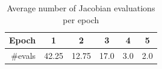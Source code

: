 \begin{table}
\renewcommand{\arraystretch}{1.3}
\centering
\small
{}
\caption{Results of training a recurrent neural network}
\label{rectab}
\end{table}


\begin{table}
\centering
\begin{tabular}{r| c c c c c }
Epoch	 	& 1	& 2 & 3 & 4 & 5 \\ \hline
\#evals & 42.25 & 12.75 & 17.0  &   3.0  &    2.0 \\
\end{tabular}
\caption{Average number of Jacobian evaluations per epoch}
\label{jevaltab}
\end{table}








